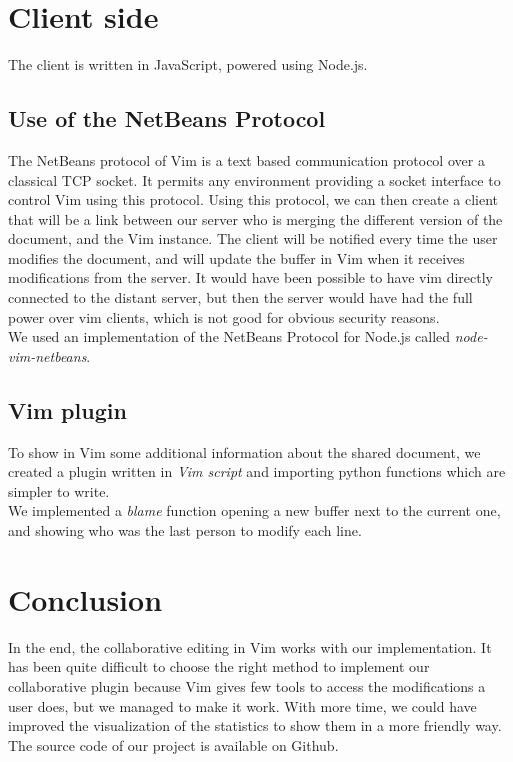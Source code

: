 \documentclass{llncs}
\begin{document}
\section{Client side}\label{sec:Others}

The client is written in JavaScript, powered using Node.js.\cite{nodejs}

\subsection{Use of the NetBeans Protocol}

The NetBeans protocol of Vim is a text based communication protocol over a
classical TCP socket.
It permits any environment providing a socket interface to control Vim using
this protocol.\cite{netbeans} Using this protocol, we can then create a client
that will be a link between our server who is merging the different version of
the document, and the Vim instance.
The client will be notified every time the user modifies the document, and will
update the buffer in Vim when it receives modifications from the server.
It would have been possible to have vim directly connected to the distant
server, but then the server would have had the full power over vim clients,
which is not good for obvious security reasons.\\
We used an implementation of the NetBeans Protocol for Node.js called
\textit{node-vim-netbeans}.\cite{node-vim-netbeans}

\subsection{Vim plugin}

To show in Vim some additional information about the shared document, we
created a plugin written in \textit{Vim script} and importing python functions
which are simpler to write.\\
We implemented a \textit{blame} function opening a new buffer next to the
current one, and showing who was the last person to modify each line.

\section{Conclusion}\label{sec:Conclusion}

In the end, the collaborative editing in Vim works with our implementation.
It has been quite difficult to choose the right method to implement our collaborative plugin
because Vim gives few tools to access the modifications a user does, but we managed to make it work.
With more time, we could have improved the visualization of the statistics to show them in a more friendly way.
The source code of our project is available on Github.\cite{github}
\end{document}

